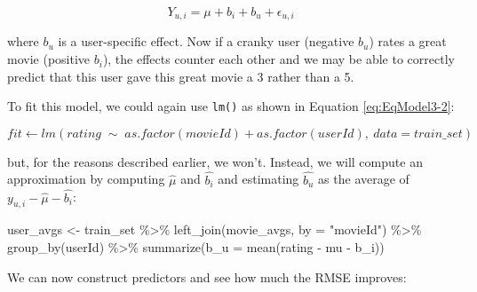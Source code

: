 \documentclass[
]{article}
\newenvironment{Shaded}{}{}
\newcommand{\AttributeTok}[1]{\textcolor[rgb]{0.49,0.56,0.16}{#1}}
\newcommand{\FunctionTok}[1]{\textcolor[rgb]{0.02,0.16,0.49}{#1}}
\newcommand{\NormalTok}[1]{#1}
\newcommand{\OtherTok}[1]{\textcolor[rgb]{0.00,0.44,0.13}{#1}}
\newcommand{\SpecialCharTok}[1]{\textcolor[rgb]{0.25,0.44,0.63}{#1}}
\newcommand{\StringTok}[1]{\textcolor[rgb]{0.25,0.44,0.63}{#1}}
\begin{document}
%
\par

\label{eq:EqModel3-1} \begin{equation}
  Y_{u,i} = \mu + b_{i} + b_{u} + \epsilon_{u,i}
\end{equation}

where \(b_{u}\) is a user-specific effect. Now if a cranky user
(negative \(b_{u}\)) rates a great movie (positive \(b_{i}\)), the
effects counter each other and we may be able to correctly predict that
this user gave this great movie a 3 rather than a 5.

To fit this model, we could again use \texttt{lm()} as shown in Equation
\ref{eq:EqModel3-2}:

%
\par

\label{eq:EqModel3-2} \begin{equation}
  fit \leftarrow lm(rating \; \sim \; as.factor(movieId) + as.factor(userId), \: data = train\_{}set)
\end{equation}

but, for the reasons described earlier, we won't. Instead, we will
compute an approximation by computing \(\hat{\mu}\) and \(\hat{b_{i}}\)
and estimating \(\hat{b_{u}}\) as the average of
\(y_{u,i}-\hat{\mu}-\hat{b_{i}}\):

\begin{Shaded}
\begin{Highlighting}[]
\NormalTok{user\_avgs }\OtherTok{\textless{}{-}}\NormalTok{ train\_set }\SpecialCharTok{\%\textgreater{}\%} \FunctionTok{left\_join}\NormalTok{(movie\_avgs, }\AttributeTok{by =} \StringTok{"movieId"}\NormalTok{) }\SpecialCharTok{\%\textgreater{}\%} 
    \FunctionTok{group\_by}\NormalTok{(userId) }\SpecialCharTok{\%\textgreater{}\%} \FunctionTok{summarize}\NormalTok{(}\AttributeTok{b\_u =} \FunctionTok{mean}\NormalTok{(rating }\SpecialCharTok{{-}}\NormalTok{ mu }\SpecialCharTok{{-}}\NormalTok{ b\_i))}
\end{Highlighting}
\end{Shaded}

We can now construct predictors and see how much the RMSE improves:
\end{document}
